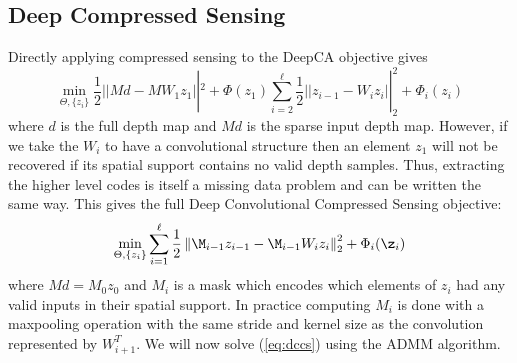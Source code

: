 \subsection{Deep Compressed Sensing}
\label{sec:deep-compr-sens}

Directly applying compressed sensing to the DeepCA objective gives
\begin{equation*}
  \min_{\Theta, \{z_i\}} \frac{1}{2} \left|| Md - MW_1z_1 \right||^2 + \Phi(z_1) \sum_{i=2}^{\ell} \frac{1}{2} \left|| z_{i-1} - W_iz_i\right||_2^2 + \Phi_i(z_i)  
\end{equation*}
where $d$ is the full depth map and $Md$ is the sparse input depth map. However, if we take the $W_i$ to have a convolutional structure then an element $z_1$ will not be recovered if its spatial support contains no valid depth samples. Thus, extracting the higher level codes is itself a missing data problem and can be written the same way. This gives the full Deep Convolutional Compressed Sensing objective:
\begin{equation}
  \label{eq:dccs}
  \min_{\Theta, \{z_i\}} \sum_{i=1}^{\ell} \frac{1}{2} \left\Vert \M_{i-1}z_{i-1} - \M_{i-1}W_iz_i\right\Vert_2^2 + \Phi_i(\z_i)
\end{equation}
where $Md = M_0z_0$ and $M_i$ is a mask which encodes which elements of $z_i$ had any valid inputs in their spatial support. In practice computing $M_i$ is done with a maxpooling operation with the same stride and kernel size as the convolution represented by $W_{i+1}^T$. We will now solve (\ref{eq:dccs}) using the ADMM algorithm.\\

